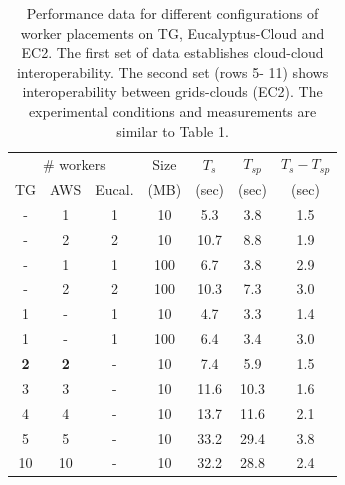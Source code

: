 \documentclass[3p,twocolumn]{elsarticle}
\begin{document}
\begin{table}
  \footnotesize
  \begin{tabular}{ccccccc}
    \hline
    \multicolumn{3}{c}{\# workers}  &  Size   &  $T_s$  & $T_{sp}$ & $T_s - T_{sp}$\\   
    TG &  AWS & Eucal. &  (MB)  & (sec) & (sec) & (sec) \\
    \hline
    - & 1 & 1 & 10   & 5.3 & 3.8 & 1.5\\
    - & 2 & 2 & 10   & 10.7 & 8.8 & 1.9 \\
    - & 1 & 1 & 100  & 6.7 & 3.8 & 2.9\\
    - & 2 & 2 & 100  & 10.3 & 7.3 & 3.0\\
    \hline 
    1 & - & 1 & 10   & 4.7 & 3.3 & 1.4\\
    1 & - & 1 & 100  & 6.4 & 3.4 & 3.0\\
    \hline 
    {\bf 2} &   {\bf 2} & - & 10 & 7.4 & 5.9 & 1.5 \\
    3 & 3 & - & 10 & 11.6 & 10.3 & 1.6 \\
    4 & 4 & - & 10 & 13.7 & 11.6 & 2.1 \\
    5 & 5 & - & 10 & 33.2 & 29.4 & 3.8 \\ 
    10 & 10 & - & 10 & 32.2 & 28.8 & 2.4 \\
    \hline
     \hline 
  \end{tabular}
  \caption{Performance data for different configurations of worker
  placements on TG, Eucalyptus-Cloud and EC2. The first set of data
  establishes cloud-cloud interoperability. The second set (rows 5-
  11) shows interoperability between grids-clouds (EC2).  The
  experimental conditions and measurements are similar to Table
  1.\label{stuff-2}}
\end{table}
\end{document}

